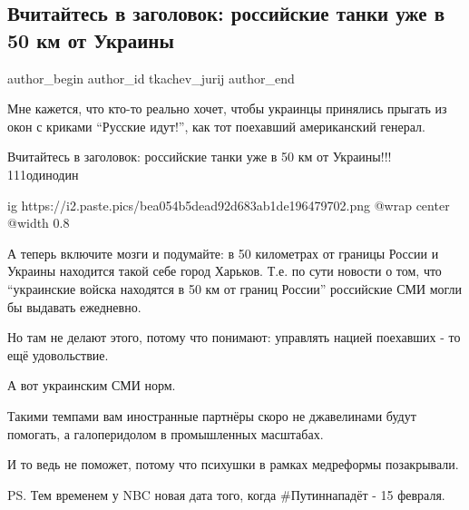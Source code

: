  
 
 
 
 
 
\subsection{Вчитайтесь в заголовок: российские танки уже в 50 км от Украины}
\label{sec:06_02_2022.tg.tkachev_jurij.1.rossijskie_tanki}
 
\ifcmt
 author_begin
   author_id tkachev_jurij
 author_end
\fi

Мне кажется, что кто-то реально хочет, чтобы украинцы принялись прыгать из окон
с криками \enquote{Русские идут!}, как тот поехавший американский генерал.

Вчитайтесь в заголовок: российские танки уже в 50 км от Украины!!! 111одинодин

\ifcmt
  ig https://i2.paste.pics/bea054b5dead92d683ab1de196479702.png
  @wrap center
  @width 0.8
\fi

А теперь включите мозги и подумайте: в 50 километрах от границы России и
Украины находится такой себе город Харьков. Т.е. по сути новости о том, что
\enquote{украинские войска находятся в 50 км от границ России} российские СМИ могли бы
выдавать ежедневно. 

Но там не делают этого, потому что понимают: управлять нацией поехавших - то
ещё удовольствие. 

А вот украинским СМИ норм.

Такими темпами вам иностранные партнёры скоро не джавелинами будут помогать, а
галоперидолом в промышленных масштабах. 

И то ведь не поможет, потому что психушки в рамках медреформы позакрывали.

PS. Тем временем у NBC новая дата того, когда \#Путиннападёт - 15 февраля.

